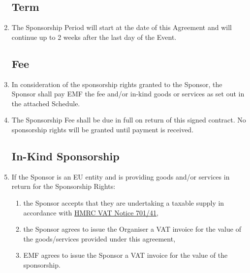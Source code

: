 \begin{enumerate}
\subsection*{Term}

\item The Sponsorship Period will start at the date of this Agreement and will continue up to
2 weeks after the last day of the Event.

\subsection*{Fee}

\item In consideration of the sponsorship rights granted to the Sponsor, the Sponsor shall
pay EMF the fee and/or in-kind goods or services as set out in the attached Schedule.

\item The Sponsorship Fee shall be due in full on return of this signed contract. No
    sponsorship rights will be granted until payment is received.


\subsection*{In-Kind Sponsorship}

\item If the Sponsor is an EU entity and is providing goods and/or services in return for the
      Sponsorship Rights:
\begin{enumerate}
      \item the Sponsor accepts that they are undertaking a taxable supply in accordance with
      \href{https://www.gov.uk/government/publications/vat-notice-70141-sponsorship/vat-notice-70141-sponsorship}{HMRC VAT Notice 701/41},
      \item the Sponsor agrees to issue the Organiser a VAT invoice for the value of the
            goods/services provided under this agreement,
      \item EMF agrees to issue the Sponsor a VAT invoice for the value of the sponsorship.
\end{enumerate}


\end{enumerate}

